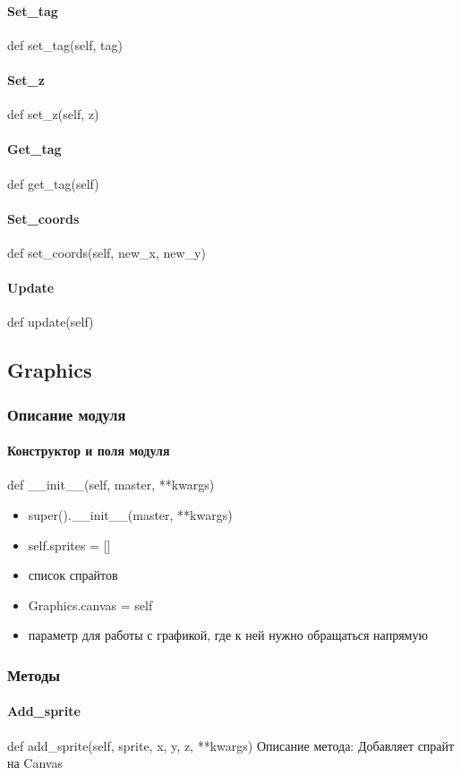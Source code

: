 \paragraph{Set\_tag}
def set\_tag(self, tag)
\paragraph{Set\_z}
def set\_z(self, z)
\paragraph{Get\_tag}
def get\_tag(self)
\paragraph{Set\_coords}
def set\_coords(self, new\_x, new\_y)
\paragraph{Update}
def update(self)
\subsection{Graphics}
\subsubsection{Описание модуля}
\paragraph{Конструктор и поля модуля}
def \_\_init\_\_(self, master, **kwargs)
\begin{itemize}
	\item super().\_\_init\_\_(master, **kwargs)
	\item self.sprites = [] 
	\item список спрайтов
	\item Graphics.canvas = self
	\item параметр для работы с графикой, где к ней нужно обращаться напрямую
\end{itemize}
\subsubsection{Методы}
\paragraph{Add\_sprite}
def add\_sprite(self, sprite, x, y, z, **kwargs)
Описание метода: Добавляет спрайт на Canvas
